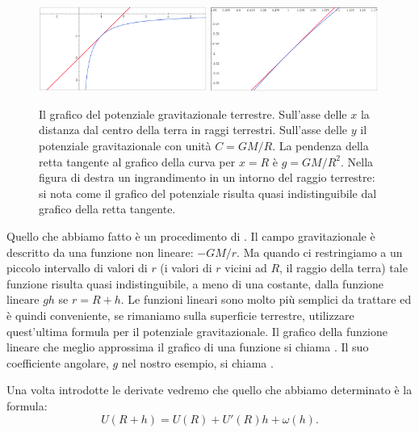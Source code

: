 \begin{figure}
\includegraphics[width=0.49\textwidth]{derivata_00.png}\hfill%
\includegraphics[width=0.49\textwidth]{derivata_01.png}
\label{fig:derivata}
\caption{Il grafico del potenziale gravitazionale terrestre.
Sull'asse delle $x$ la distanza dal centro della terra in raggi terrestri.
Sull'asse delle $y$ il potenziale gravitazionale con unità $C=GM/R$.
La pendenza della retta tangente al grafico della curva per $x=R$ è $g=GM/R^2$.
Nella figura di destra un ingrandimento in un intorno del raggio terrestre:
si nota come il grafico del potenziale risulta quasi indistinguibile dal
grafico della retta tangente.}
\end{figure}

Quello che abbiamo fatto è un procedimento di . 
Il campo gravitazionale è descritto da una funzione non lineare: $-GM/r$.
Ma quando ci restringiamo a un piccolo intervallo di valori di $r$ 
(i valori di $r$ vicini ad $R$, il raggio della terra) tale funzione 
risulta quasi indistinguibile, a meno di una costante, dalla funzione 
lineare $gh$ se $r=R+h$.
Le funzioni lineari sono molto più semplici da trattare ed è quindi conveniente, 
se rimaniamo sulla superficie terrestre, utilizzare quest'ultima formula per 
il potenziale gravitazionale.
Il grafico della funzione lineare che meglio approssima il grafico di una 
funzione si chiama . 
Il suo coefficiente angolare, $g$ nel nostro esempio, si chiama .

Una volta introdotte le derivate vedremo che quello che abbiamo
determinato è la formula:
\[
U(R+h) = U(R) + U'(R) h + \omega(h).
\]

